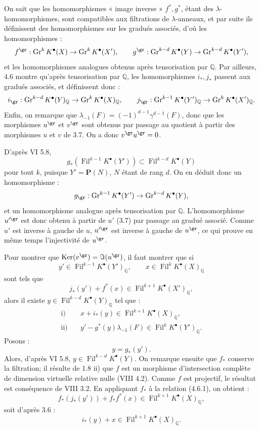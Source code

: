 \documentclass[11pt]{article}
\newcommand{\Fil}{\operatorname{Fil}}
\providecommand{\Ker}{\operatorname{Ker}}
\begin{document}
On sait que les homomorphismes « image inverse » \(f^*,g^*\), étant des \(\lambda\)-homomorphismes, sont compatibles aux filtrations de \(\lambda\)-anneaux, et par suite ils définissent des homomorphismes sur les gradués associés, d'où les homomorphismes :
\[
  f^{\gr}:\operatorname{Gr}^kK^\bullet(X)\to\operatorname{Gr}^kK^\bullet(X'),
  \qquad
  g^{\gr}:\operatorname{Gr}^{k-d}K^\bullet(Y)\to\operatorname{Gr}^{k-d}K^\bullet(Y'),
\]
et les homomorphismes analogues obtenus après tensorisation par \(\mathbb Q\). Par ailleurs, 4.6 montre qu'après tensorisation par \(\mathbb Q\), les homomorphismes \(i_*,j_*\) passent aux gradués associés, et définissent donc :
\[
  i_{\gr}:\operatorname{Gr}^{k-d}K^\bullet(Y)_{\mathbb Q}
  \to \operatorname{Gr}^{k}K^\bullet(X)_{\mathbb Q},
  \qquad
  j_{\gr}:\operatorname{Gr}^{k-1}K^\bullet(Y')_{\mathbb Q}
  \to \operatorname{Gr}^{k}K^\bullet(X')_{\mathbb Q}.
\]
Enfin, on remarque que \(\lambda_{-1}(F)=(-1)^{d-1}\gamma^{d-1}(F)\), donc que les morphismes \(u^{\gr}\) et \(v^{\gr}\) sont obtenus par passage au quotient à partir des morphismes \(u\) et \(v\) de 3.7. On a donc \(v^{\gr}u^{\gr}=0\).

D'après VI 5.8,
\[
  g_*(\Fil^{k-1}K^\bullet(Y'))\subset \Fil^{k-d}K^\bullet(Y)
\]
pour tout \(k\), puisque \(Y'=\mathbf P(N)\), \(N\) étant de rang \(d\). On en déduit donc un homomorphisme :
\[
  g_{\gr}:\operatorname{Gr}^{k-1}K^\bullet(Y')
  \to\operatorname{Gr}^{k-d}K^\bullet(Y),
\]
et un homomorphisme analogue après tensorisation par \(\mathbb Q\). L'homomorphisme \(u'^{\gr}\) est donc obtenu à partir de \(u'\) (3.7) par passage au gradué associé. Comme \(u'\) est inverse à gauche de \(u\), \(u'^{\gr}\) est inverse à gauche de \(u^{\gr}\), ce qui prouve en même temps l'injectivité de \(u^{\gr}\).

Pour montrer que \(\Ker(v^{\gr})=\Im(u^{\gr})\), il faut montrer que si
\[
y'\in\Fil^{k-1}K^\bullet(Y')_{\mathbb Q},\qquad
x\in\Fil^kK^\bullet(X)_{\mathbb Q}
\]
sont tels que
\begin{equation}\tag{4.6.1}
  j_*(y')+f^*(x)\in\Fil^{k+1}K^\bullet(X')_{\mathbb Q},
\end{equation}
alors il existe \(y\in\Fil^{k-d}K^\bullet(Y)_{\mathbb Q}\) tel que :
\[
\begin{aligned}
\text{i)}\quad &x+i_*(y)\in\Fil^{k+1}K^\bullet(X)_{\mathbb Q},\\
\text{ii)}\quad &y'-g^*(y)\lambda_{-1}(F)\in\Fil^{k}K^\bullet(Y')_{\mathbb Q}.
\end{aligned}
\]
Posons :
\[
  y=g_*(y').
\]
Alors, d'après VI 5.8, \(y\in\Fil^{k-d}K^\bullet(Y)\). On remarque ensuite que \(f_*\) conserve la filtration; il résulte de 1.8 ii) que \(f\) est un morphisme d'intersection complète de dimension virtuelle relative nulle (VIII 4.2). Comme \(f\) est projectif, le résultat est conséquence de VIII 3.2. En appliquant \(f_*\) à la relation (4.6.1), on obtient :
\[
  f_*(j_*(y'))+f_*f^*(x)\in\Fil^{k+1}K^\bullet(X)_{\mathbb Q},
\]
soit d'après 3.6 :
\[
  i_*(y)+x\in\Fil^{k+1}K^\bullet(X)_{\mathbb Q}.
\]
\end{document}
